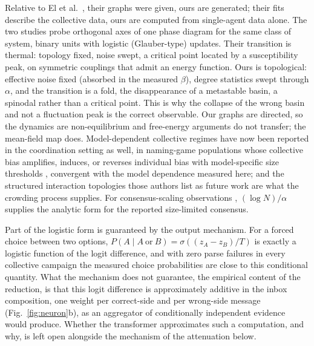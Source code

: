 \documentclass{ieeeaccess}
\begin{document}
Relative to El et al.~\cite{El2026}, their graphs were given, ours are generated;
their fits describe the collective data, ours are computed from
single-agent data alone. The two studies probe orthogonal axes of one phase
diagram for the same class of system, binary units with logistic
(Glauber-type) updates. Their transition is thermal: topology fixed, noise
swept, a critical point located by a susceptibility peak, on symmetric
couplings that admit an energy function. Ours is topological: effective
noise fixed (absorbed in the measured $\beta$), degree statistics swept
through $\alpha$, and the transition is a fold, the disappearance of a
metastable basin, a spinodal rather than a critical point. This is why the
collapse of the wrong basin and not a fluctuation peak is the correct
observable. Our graphs are directed, so the dynamics are non-equilibrium
and free-energy arguments do not transfer; the mean-field map does.
Model-dependent collective regimes have now been reported in the
coordination setting as well, in naming-game populations whose collective
bias amplifies, induces, or reverses individual bias with model-specific
size thresholds \cite{Flint2026}, convergent with the model dependence
measured here; and the structured interaction topologies those authors
list as future work are what the crowding process supplies. For
consensus-scaling observations \cite{DeMarzo2024}, $(\log N)/\alpha$
supplies the analytic form for the reported size-limited consensus.

Part of the logistic form is guaranteed by the output mechanism. For a
forced choice between two options, $P(A \mid A\ \text{or}\ B) =
\sigma((z_A - z_B)/T)$ is exactly a logistic function of the logit
difference, and with zero parse failures in every collective campaign the
measured choice probabilities are close to this conditional quantity. What
the mechanism does not guarantee, the empirical content of the reduction,
is that this logit difference is approximately additive in the inbox
composition, one weight per correct-side and per wrong-side message
(Fig.~\ref{fig:neuron}b), as an aggregator of conditionally independent
evidence would produce. Whether the transformer approximates such a
computation, and why, is left open alongside the mechanism of the
attenuation below.
\end{document}
